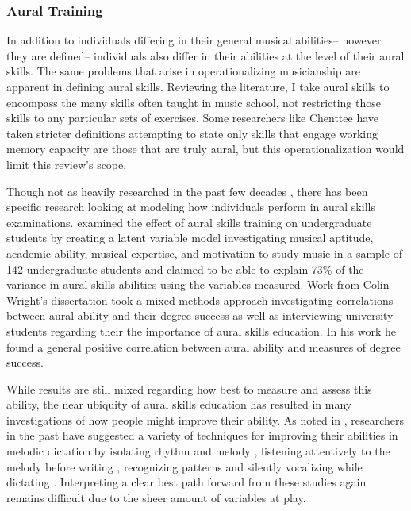 \documentclass[]{book}
\begin{document}
\hypertarget{aural-training}{%
\subsubsection{Aural Training}\label{aural-training}}

In addition to individuals differing in their general musical abilities-- however they are defined-- individuals also differ in their abilities at the level of their aural skills.
The same problems that arise in operationalizing musicianship are apparent in defining aural skills.
Reviewing the literature, I take aural skills to encompass the many skills often taught in music school, not restricting those skills to any particular sets of exercises.
Some researchers like Chenttee \citep{chenetteReframingAuralSkills2019} have taken stricter definitions attempting to state only skills that engage working memory capacity are those that are truly aural, but this operationalization would limit this review's scope.

Though not as heavily researched in the past few decades \citep{furbyEffectsPeerTutoring2016}, there has been specific research looking at modeling how individuals perform in aural skills examinations.
\citet{harrisonEffectsMusicalAptitude1994} examined the effect of aural skills training on undergraduate students by creating a latent variable model investigating musical aptitude, academic ability, musical expertise, and motivation to study music in a sample of 142 undergraduate students and claimed to be able to explain 73\% of the variance in aural skills abilities using the variables measured.
Work from Colin Wright's dissertation took a mixed methods approach investigating correlations between aural ability and their degree success as well as interviewing university students regarding their the importance of aural skills education.
In his work he found a general positive correlation between aural ability and measures of degree success.

While results are still mixed regarding how best to measure and assess this ability, the near ubiquity of aural skills education has resulted in many investigations of how people might improve their ability.
As noted in \citet{furbyEffectsPeerTutoring2016}, researchers in the past have suggested a variety of techniques for improving their abilities in melodic dictation by isolating rhythm and melody \citep{bantonRoleVisualAuditory1995, blandSightSingingMelodic1984, rootMethodicalSightSingingLessons1931}, listening attentively to the melody before writing \citep{bantonRoleVisualAuditory1995}, recognizing patterns \citep{bantonRoleVisualAuditory1995, blandSightSingingMelodic1984, rootMethodicalSightSingingLessons1931} and silently vocalizing while dictating \citep{klonoskiImprovingDictationAuralSkills2006}.
Interpreting a clear best path forward from these studies again remains difficult due to the sheer amount of variables at play.
\end{document}
